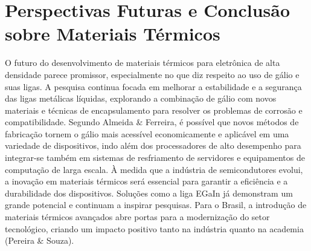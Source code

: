 \documentclass[12pt]{article}
\begin{document}
\section{Perspectivas Futuras e Conclusão sobre Materiais Térmicos}
O futuro do desenvolvimento de materiais térmicos para eletrônica de alta densidade parece promissor, especialmente no que diz respeito ao uso de gálio e suas ligas. A pesquisa continua focada em melhorar a estabilidade e a segurança das ligas metálicas líquidas, explorando a combinação de gálio com novos materiais e técnicas de encapsulamento para resolver os problemas de corrosão e compatibilidade. Segundo Almeida \& Ferreira, é possível que novos métodos de fabricação tornem o gálio mais acessível economicamente e aplicável em uma variedade de dispositivos, indo além dos processadores de alto desempenho para integrar-se também em sistemas de resfriamento de servidores e equipamentos de computação de larga escala.
À medida que a indústria de semicondutores evolui, a inovação em materiais térmicos será essencial para garantir a eficiência e a durabilidade dos dispositivos. Soluções como a liga EGaIn já demonstram um grande potencial e continuam a inspirar pesquisas. Para o Brasil, a introdução de materiais térmicos avançados abre portas para a modernização do setor tecnológico, criando um impacto positivo tanto na indústria quanto na academia (Pereira \& Souza).
\newpage
\printbibliography
\end{document}
